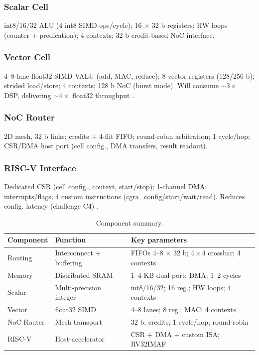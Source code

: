 \documentclass[conference]{IEEEtran}
\begin{document}
\subsubsection{Scalar Cell}
int8/16/32 ALU (4 int8 SIMD ops/cycle); 16 $\times$ 32 b registers; HW loops (counter + predication); 4 contexts; 32 b credit-based NoC interface.

\subsubsection{Vector Cell}
4–8-lane float32 SIMD VALU (add, MAC, reduce); 8 vector registers (128/256 b); strided load/store; 4 contexts; 128 b NoC (burst mode). Will consume $\sim3\times$ DSP, delivering $\sim4\times$ float32 throughput \cite{exploration_tradeoffs}.

\subsubsection{NoC Router}
2D mesh, 32 b links; credits + 4-flit FIFO; round-robin arbitration; 1 cycle/hop; CSR/DMA host port (cell config., DMA transfers, result readout).

\subsubsection{RISC-V Interface}
Dedicated CSR (cell config., context, start/stop); 1-channel DMA; interrupts/flags; 4 custom instructions (cgra\_config/start/wait/read). Reduces config. latency (challenge C4) \cite{cgra_risc, dvhetero}.

\begin{table}[htbp]
\centering
\caption{Component summary.}
\label{tab:resumen_componentes}
\small
\begin{tabular}{@{}p{}p{}p{}@{}}
\toprule
\textbf{Component} & \textbf{Function} & \textbf{Key parameters} \\
\midrule
Routing & Interconnect + buffering & FIFOs 4–8 $\times$ 32 b; $4\times4$ crossbar; 4 contexts \\
Memory & Distributed SRAM & 1–4 KB dual-port; DMA; 1–2 cycles \\
Scalar & Multi-precision integer & int8/16/32; 16 reg.; HW loops; 4 contexts \\
Vector & float32 SIMD & 4–8 lanes; 8 reg.; MAC; 4 contexts \\
NoC Router & Mesh transport & 32 b; credits; 1 cycle/hop; round-robin \\
RISC-V & Host-accelerator & CSR + DMA + custom ISA; RV32IMAF \\
\bottomrule
\end{tabular}
\end{table}
\end{document}
